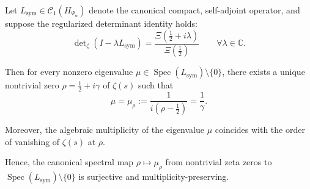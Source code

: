 \begin{lemma}
\label{lem:spectral_exhaustivity}
Let \( L_{\mathrm{sym}} \in \mathcal{C}_1(H_{\Psi_\alpha}) \) denote the canonical compact, self-adjoint operator, and suppose the regularized determinant identity holds:
\[
\det\nolimits_\zeta(I - \lambda L_{\mathrm{sym}})
= \frac{\Xi\left(\tfrac{1}{2} + i\lambda\right)}{\Xi\left(\tfrac{1}{2}\right)}
\qquad \forall \lambda \in \mathbb{C}.
\]

Then for every nonzero eigenvalue \( \mu \in \operatorname{Spec}(L_{\mathrm{sym}}) \setminus \{0\} \), there exists a unique nontrivial zero \( \rho = \tfrac{1}{2} + i\gamma \) of \( \zeta(s) \) such that
\[
\mu = \mu_\rho := \frac{1}{i(\rho - \tfrac{1}{2})} = \frac{1}{\gamma}.
\]

Moreover, the algebraic multiplicity of the eigenvalue \( \mu \) coincides with the order of vanishing of \( \zeta(s) \) at \( \rho \).

\medskip
\noindent
Hence, the canonical spectral map \( \rho \mapsto \mu_\rho \) from nontrivial zeta zeros to \( \operatorname{Spec}(L_{\mathrm{sym}}) \setminus \{0\} \) is surjective and multiplicity-preserving.
\end{lemma}
% 